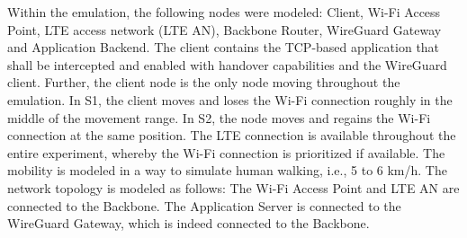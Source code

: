
Within the emulation, the following nodes were modeled: Client, Wi-Fi Access Point, LTE access network (LTE AN), Backbone Router, WireGuard Gateway and Application Backend.
The client contains the TCP-based application that shall be intercepted and enabled with handover capabilities and the WireGuard client.
Further, the client node is the only node moving throughout the emulation.
In S1, the client moves and loses the Wi-Fi connection roughly in the middle of the movement range. 
In S2, the node moves and regains the Wi-Fi connection at the same position.
The LTE connection is available throughout the entire experiment, whereby the Wi-Fi connection is prioritized if available.
The mobility is modeled in a way to simulate human walking, i.e., 5 to 6 km/h.
The network topology is modeled as follows: 
The Wi-Fi Access Point and LTE AN are connected to the Backbone.
The Application Server is connected to the WireGuard Gateway, which is indeed connected to the Backbone.

